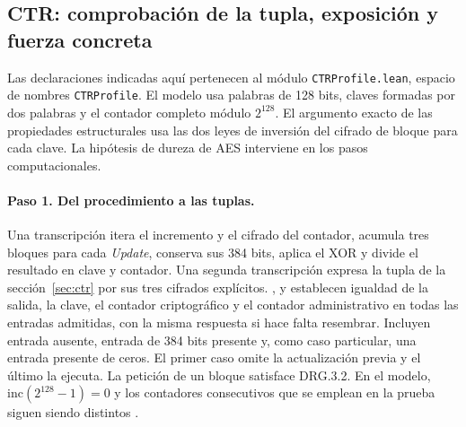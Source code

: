 \subsection{CTR: comprobación de la tupla, exposición y fuerza concreta}
\label{sec:ctr-verified}
Las declaraciones indicadas aquí pertenecen al módulo
\nolinkurl{CTRProfile.lean}, espacio de nombres \nolinkurl{CTRProfile}. El modelo
usa palabras de 128 bits, claves formadas por dos palabras y el contador
completo módulo \(2^{128}\). El argumento exacto de las propiedades
estructurales usa las dos leyes de inversión del cifrado de bloque para cada
clave. La hipótesis de dureza de AES interviene en los pasos computacionales.

\paragraph{Paso 1. Del procedimiento a las tuplas.}
Una transcripción itera el incremento y el cifrado del contador, acumula
tres bloques para cada \emph{Update}, conserva sus 384 bits, aplica el XOR
y divide el resultado en clave y contador. Una segunda transcripción expresa
la tupla de la sección~\ref{sec:ctr} por sus tres cifrados explícitos.
,  y
 establecen igualdad de la salida, la clave,
el contador criptográfico y el contador administrativo en todas las entradas
admitidas, con la misma respuesta si hace falta resembrar. Incluyen entrada
ausente, entrada de 384 bits presente y, como caso particular, una entrada
presente de ceros. El primer caso omite la actualización previa y el último
la ejecuta. La petición de un bloque satisface DRG.3.2. En el modelo,
\(\mathrm{inc}(2^{128}-1)=0\) y los contadores consecutivos que se
emplean en la prueba siguen siendo distintos
\cite[§§10.2.1.2 y 10.2.1.5.1]{nist90a}.

